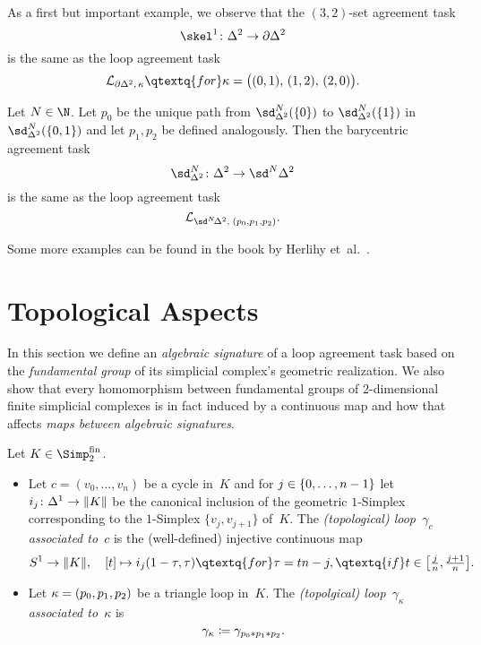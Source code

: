 \begin{thExample}
    As a first but important example, we observe that the
    $(3,2)$-set agreement task 
    \[ \skel^1\colon\Delta^2\to\partial\Delta^2 \]
    is the same as the loop agreement task
    \[ \Loop{\partial\Delta^2,\,\kappa}
        \qtextq{for}
        \kappa = \bigl( (0,1),\, (1,2),\, (2,0) \bigr)
    . \]
\end{thExample}

\begin{thExample}
    Let $N\in\N$. Let $p_0$ be the unique path from $\sd_{\Delta^2}^N(\{0\})$
    to $\sd_{\Delta^2}^N(\{1\})$ in $\sd_{\Delta^2}^N(\{0,1\})$ and let
    $p_1,p_2$ be defined analogously. Then the barycentric agreement task
    \[ \sd_{\Delta^2}^N\colon \Delta^2 \to \sd^N \Delta^2 \]
    is the same as the loop agreement task
    \[ \Loop{\sd^N\!\Delta^2, \; (p_0,p_1,p_2)}  . \]
\end{thExample}

Some more examples can be found in the book by
Herlihy et~al.~\cite[Sec.~5.6.3]{bookc:herlihyetal13}.

\section{Topological Aspects}
In this section we define an \emph{algebraic signature} of a loop agreement task
based on the \emph{fundamental group} of its simplicial complex's geometric
realization. We also show that every homomorphism between fundamental groups
of $2$-dimensional finite simplicial complexes  %
is in fact induced by a continuous map and how that affects \emph{maps between
algebraic signatures}.

\begin{thDef}
    Let $K\in\finSimp$.
    \begin{itemize}
        \item
            Let $c=(v_0,\dots,v_n)$ be a cycle in~$K$ and for
            $j\in\{0,\ldots,n-1\}$ let $i_j\colon\Delta^1\to\lVert K\rVert$ be the
            canonical inclusion of the geometric $1$-Simplex corresponding to
            the $1$-Simplex $\{v_j,v_{j+1}\}$ of~$K$.
            The \emph{(topological) loop~$\gamma_c$ associated to~$c$} is the
            (well-defined) injective continuous map
            \[
                S^1\to\geom K, \quad
                [t]\mapsto i_j(1-\tau,\tau) \qtextq{for} \tau=tn-j,
                    \qtextq{if} t\in\bigl[\tfrac{j}{n}, \tfrac{j+1}{n}\bigr]
            . \]
            
        \item
            Let $\kappa=(p_0,p_1,p_2)$ be a triangle loop in~$K$. The \emph{(topolgical)
            loop~$\gamma_\kappa$ associated to~$\kappa$} is
            \[ \gamma_\kappa \coloneqq \gamma_{p_0\ast p_1\ast p_2}  . \]
    \end{itemize}
\end{thDef}

